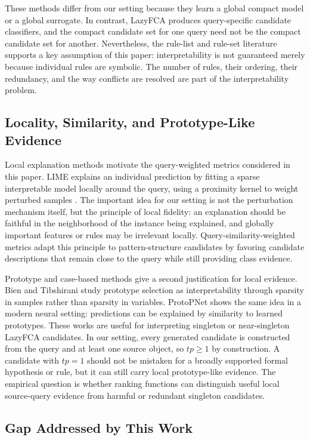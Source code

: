 \documentclass[11pt]{article}
\begin{document}
These methods differ from our setting because they learn a global compact
model or a global surrogate. In contrast, LazyFCA produces query-specific
candidate classifiers, and the compact candidate set for one query need not be
the compact candidate set for another. Nevertheless, the rule-list and
rule-set literature supports a
key assumption of this paper: interpretability is not guaranteed merely
because individual rules are symbolic. The number of rules, their ordering,
their redundancy, and the way conflicts are resolved are part of the
interpretability problem.

\subsection{Locality, Similarity, and Prototype-Like Evidence}

Local explanation methods motivate the query-weighted metrics considered in
this paper. LIME explains an individual prediction by fitting a sparse
interpretable model locally around the query, using a proximity kernel to
weight perturbed samples \cite{ribeiro2016should}. The important idea for our
setting is not the perturbation mechanism itself, but the principle of local
fidelity: an explanation should be faithful in the neighborhood of the
instance being explained, and globally important features or rules may be
irrelevant locally. Query-similarity-weighted metrics adapt this principle to
pattern-structure candidates by favoring candidate descriptions that remain
close to the query while still providing class evidence.

Prototype and case-based methods give a second justification for local
evidence. Bien and Tibshirani \cite{bien2011prototype} study prototype
selection as interpretability through sparsity in samples rather than
sparsity in variables. ProtoPNet \cite{chen2019looks} shows the same idea in
a modern neural setting: predictions can be explained by similarity to learned
prototypes. These works are useful for interpreting singleton or near-singleton
LazyFCA candidates. In our setting, every generated candidate is constructed
from the query and at least one source object, so $tp \geq 1$ by construction.
A candidate with $tp=1$ should not be mistaken for a broadly supported formal
hypothesis or rule, but it can still carry local prototype-like evidence. The
empirical question is whether ranking functions can distinguish useful local
source-query evidence from harmful or redundant singleton candidates.

\subsection{Gap Addressed by This Work}
\end{document}
